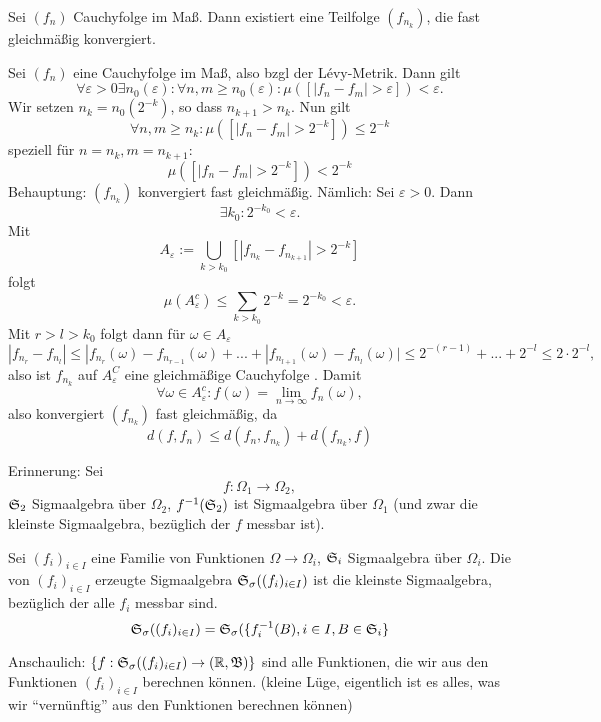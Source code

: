 			\begin{satz}
				Sei $(f_n)$ Cauchyfolge im Maß. Dann existiert eine Teilfolge $(f_{n_k})$, die fast gleichmäßig konvergiert. 
			\end{satz}
			
			\begin{bew}
				Sei $(f_n)$ eine Cauchyfolge im Maß, also bzgl der Lévy-Metrik. Dann gilt
				\[ \forall \varepsilon>0\exists n_0(\varepsilon): \forall n,m\ge n_0(\varepsilon): \mu([|f_n-f_m|>\varepsilon])<\varepsilon. \]
				Wir setzen $n_k=n_0(2^{-k})$, so dass $n_{k+1}>n_k$. Nun gilt
				\[ \forall n,m\ge n_k: \mu([|f_n-f_m|>2^{-k}])\le 2^{-k} \]
				speziell für $n=n_k, m=n_{k+1}$:
				\[ \mu([|f_n-f_m|>2^{-k}])<2^{-k} \]
				Behauptung: $(f_{n_k})$ konvergiert fast gleichmäßig. Nämlich: Sei $\varepsilon>0$. Dann
				\[ \exists k_0: 2^{-k_0}<\varepsilon. \]
				Mit 
				\[ A_\varepsilon:=\bigcup_{k>k_0}[|f_{n_k}-f_{n_{k+1}}|>2^{-k}] \]
				folgt
				\[ \mu(A_\varepsilon^c)\le \sum_{k>k_0} 2^{-k}=2^{-k_0}<\varepsilon. \]
				Mit $r>l>k_0$ folgt dann für $\omega\in A_\varepsilon$
				\[ |f_{n_r}-f_{n_l}|\le |f_{n_r}(\omega)-f_{n_{r-1}}(\omega)+...+|f_{n_{l+1}}(\omega)-f_{n_l}(\omega)|\le 2^{-(r-1)}+...+2^{-l}\le 2\cdot 2^{-l}, \]
				also ist $f_{n_k}$ auf $A_\varepsilon^C$ eine gleichmäßige Cauchyfolge . Damit
				\[ \forall \omega\in A_\varepsilon^c:f(\omega)=\lim_{n\to\infty} f_n(\omega), \]
				also konvergiert  $(f_{n_k})$ fast gleichmäßig, da
				\[ d(f,f_n)\le d(f_n,f_{n_k})+d(f_{n_k},f) \]
			\end{bew}
			
			Erinnerung:
				Sei 
				\[ f: \Omega_1\to \Omega_2, \]
				$\mathfrak{S}_2$ Sigmaalgebra über $\Omega_2$, $f^{-1}(\mathfrak{S}_2)$ ist Sigmaalgebra über $\Omega_1$ (und zwar die kleinste Sigmaalgebra, bezüglich der $f$ messbar ist).
			
			\begin{defi}
				Sei $(f_i)_{i\in I}$ eine Familie von Funktionen $\Omega\to\Omega_i$, $\mathfrak{S}_i$ Sigmaalgebra über $\Omega_i$. Die von $(f_i)_{i\in I}$ erzeugte Sigmaalgebra $\mathfrak{S}_\sigma((f_i)_{i\in I})$ ist die kleinste Sigmaalgebra, bezüglich der alle $f_i$ messbar sind.
				\[ \mathfrak{S}_\sigma((f_i)_{i\in I})=\mathfrak{S}_\sigma(\{f_i^{-1}(B), i\in I, B\in\mathfrak{S}_i\} \]
			\end{defi}
			
			\begin{bem}
				Anschaulich: $\{f: \mathfrak{S}_\sigma((f_i)_{i\in I})\to (\mathbb{R},\mathfrak{B})\}$ sind alle Funktionen, die wir aus den Funktionen $(f_i)_{i\in I}$ berechnen können. (kleine Lüge, eigentlich ist es alles, was wir "`vernünftig"' aus den Funktionen berechnen können)
			\end{bem}
			
